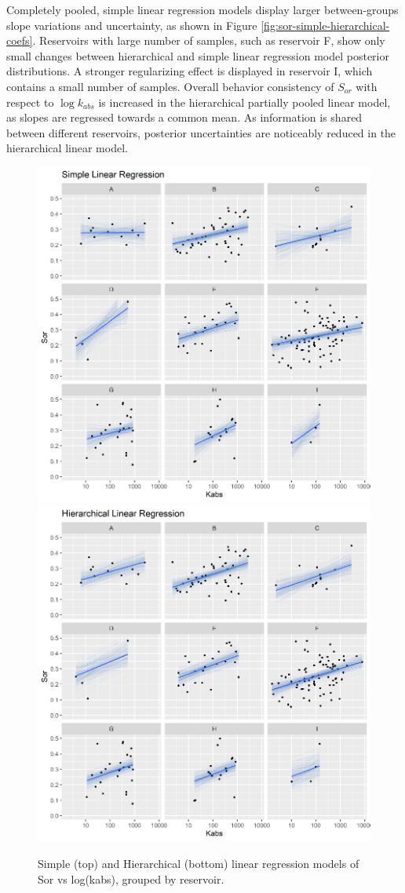 \documentclass[english,msc,numbers]{coppe}
\begin{document}
  Completely pooled, simple linear regression models display larger between-groups slope variations and uncertainty, as shown in Figure \ref{fig:sor-simple-hierarchical-coefs}. Reservoirs with large number of samples, such as reservoir F, show only small changes between hierarchical and simple linear regression model posterior distributions. A stronger regularizing effect is displayed in reservoir I, which contains a small number of samples. Overall behavior consistency of \(S_{or}\) with respect to \(\log{k_{abs}}\) is increased in the hierarchical partially pooled linear model, as slopes are regressed towards a common mean. As information is shared between different reservoirs, posterior uncertainties are noticeably reduced in the hierarchical linear model.
  \begin{figure}
  
  {\centering \includegraphics[width=0.75\linewidth]{figure/4-10-sor-simple} \includegraphics[width=0.75\linewidth]{figure/4-10-sor-hierarchical} 
  
  }
  
  \caption{Simple (top) and Hierarchical (bottom) linear regression models of Sor vs log(kabs), grouped by reservoir.}\label{fig:sor-simple-hierarchical}
  \end{figure}
\end{document}
